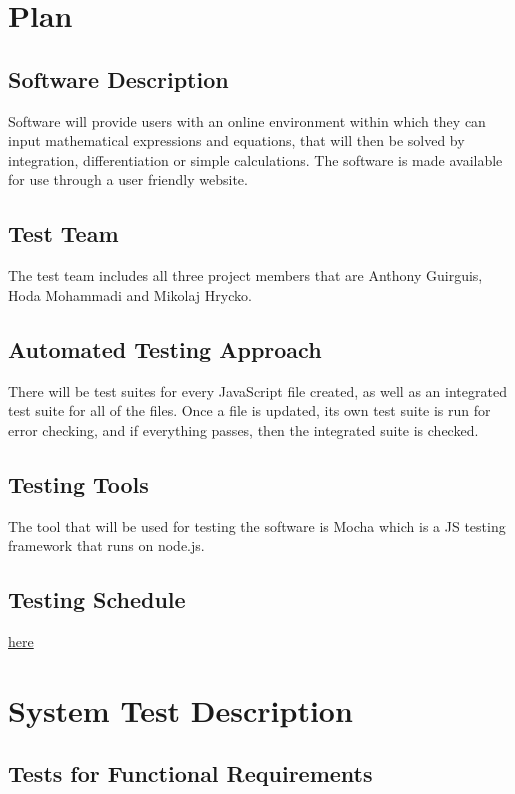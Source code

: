\documentclass[12pt, titlepage]{article}
\begin{document}
\section{Plan}
	
\subsection{Software Description}
Software will provide users with an online environment within which they can input mathematical expressions and equations, that will then be solved by integration, differentiation or simple calculations. The software is made available for use through a user friendly website. 

\subsection{Test Team}
The test team includes all three project members that are Anthony Guirguis, Hoda Mohammadi and Mikolaj Hrycko. 

\subsection{Automated Testing Approach}
There will be test suites for every JavaScript file created, as well as an integrated test suite for all of the files. Once a file is updated, its own test suite is run for error checking, and if everything passes, then the integrated suite is checked.

\subsection{Testing Tools}
The tool that will be used for testing the software is Mocha which is a JS testing framework that runs on node.js. 

\subsection{Testing Schedule}
		
\href{run:./ProjectSchedule/3xa3.gan}{here}

\section{System Test Description}
	
\subsection{Tests for Functional Requirements}
\end{document}
